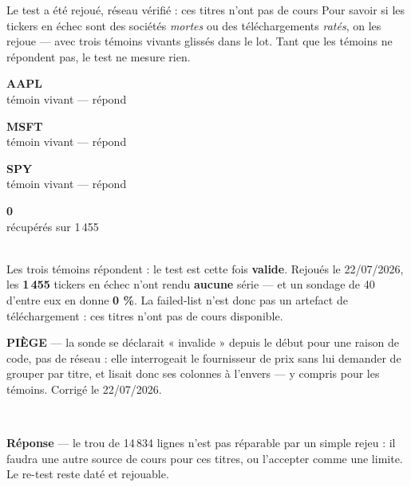 \documentclass[11pt,aspectratio=169]{beamer}
\newcommand{\tuile}[3]{%
  \begin{minipage}[t]{0.23\textwidth}\centering
    \colorbox{#1}{\parbox[c][20mm][c]{\dimexpr\linewidth-8pt}{\centering
      {\color{white}\Large\textbf{#2}}\\[0.5mm]{\color{white}\footnotesize #3}}}
  \end{minipage}}
\newcommand{\repband}[1]{%
  \colorbox{okgreen!12}{\parbox{\dimexpr\textwidth-10pt}{\scriptsize
    \textbf{\textcolor{okgreen}{Réponse}}\; --- #1}}}
\newcommand{\piege}[1]{%
  \colorbox{warnorange!12}{\parbox{\dimexpr\linewidth-8pt}{\scriptsize
    \textbf{\textcolor{warnorange}{PIÈGE}}\; --- #1}}}
\begin{document}
\begin{frame}{Le test a été rejoué, réseau vérifié : ces titres n'ont pas de cours}
  \centering
  {\footnotesize Pour savoir si les tickers en échec sont des sociétés \emph{mortes} ou des
  téléchargements \emph{ratés}, on les rejoue --- avec trois témoins vivants glissés dans le lot.
  Tant que les témoins ne répondent pas, le test ne mesure rien.}\\[3mm]
  \tuile{okgreen}{AAPL}{témoin vivant --- répond}
  \tuile{okgreen}{MSFT}{témoin vivant --- répond}
  \tuile{okgreen}{SPY}{témoin vivant --- répond}
  \tuile{alertred}{0}{récupérés sur 1\,455}\\[4mm]
  {\footnotesize Les trois témoins répondent : le test est cette fois \textbf{valide}. Rejoués le
  22/07/2026, les \textbf{1\,455} tickers en échec n'ont rendu \textbf{aucune} série --- et un
  sondage de 40 d'entre eux en donne \textbf{0 \%}. La failed-list n'est donc pas un artefact de
  téléchargement : ces titres n'ont pas de cours disponible.}\\[3mm]
  \piege{la sonde se déclarait « invalide » depuis le début pour une raison de code, pas de réseau :
  elle interrogeait le fournisseur de prix sans lui demander de grouper par titre, et lisait donc
  ses colonnes à l'envers --- y compris pour les témoins. Corrigé le 22/07/2026.}\\[2mm]
  \repband{le trou de 14\,834 lignes n'est pas réparable par un simple rejeu : il faudra une autre
  source de cours pour ces titres, ou l'accepter comme une limite. Le re-test reste daté et rejouable.}
\end{frame}
\end{document}
